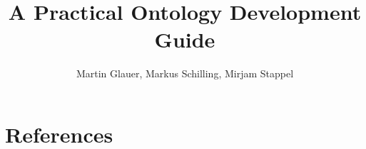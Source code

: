 \documentclass[final]{ol-softwaremanual}
\title{A Practical Ontology Development Guide}
\author{Martin Glauer, Markus Schilling, Mirjam Stappel}
\begin{document}
\maketitle

\listoftodos

\tableofcontents

\newpage





%


\section{References}



%
\end{document}
